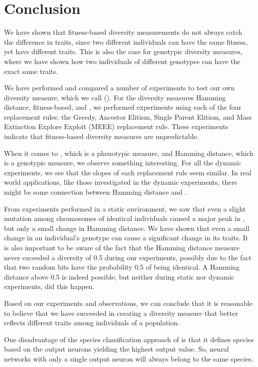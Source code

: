 \section{Conclusion}\label{sec:conclusion}
We have shown that fitness-based diversity measurements do not always catch the difference in traits, since two different individuals can have the same fitness, yet have different traits. This is also the case for genotypic diversity measures, where we have shown how two individuals of different genotypes can have the exact same traits.

We have performed and compared a number of experiments to test our own diversity measure, which we call \di{} (\dia{}). For the diversity measures Hamming distance, fitness-based, and \dia{}, we performed experiments using each of the four replacement rules: the Greedy, Ancestor Elitism, Single Parent Elitism, and Mass Extinction Explore Exploit (MEEE) replacement rule. These experiments indicate that fitness-based diversity measures are unpredictable.

When it comes to \dia{}, which is a phenotypic measure, and Hamming distance, which is a genotypic measure, we observe something interesting. For all the dynamic experiments, we see that the slopes of each replacement rule seem similar. In real world applications, like those investigated in the dynamic experiments, there might be some connection between Hamming distance and \dia{}.

From experiments performed in a static environment, we saw that even a slight mutation among chromosomes of identical individuals caused a major peak in \dia{}, but only a small change in Hamming distance. We have shown that even a small change in an individual's genotype can cause a significant change in its traits. It is also important to be aware of the fact that the Hamming distance measure never exceeded a diversity of \num{0.5} during our experiments, possibly due to the fact that two random bits have the probability \num{0.5} of being identical. A Hamming distance above \num{0.5} is indeed possible, but neither during static nor dynamic experiments, did this happen. 

Based on our experiments and observations, we can conclude that it is reasonable to believe that we have succeeded in creating a diversity measure that better reflects different traits among individuals of a population.

One disadvantage of the species classification approach of \dia{} is that it defines species based on the output neurons yielding the highest output value. So, neural networks with only a single output neuron will always belong to the same species.

